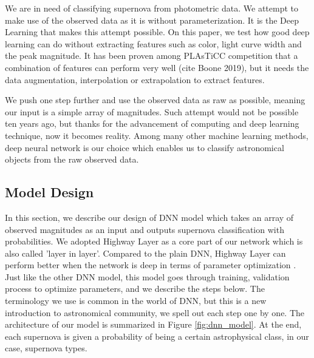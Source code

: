 \documentclass[useamsfonts]{pasj01}
\begin{document}
We are in need of classifying supernova from photometric data.  We attempt to make use of the observed data as it is without parameterization.  It is the Deep Learning that makes this attempt possible.   On this paper, we test how good deep learning can do without extracting features such as color, light curve width and the peak magnitude.  It has been proven among PLAsTiCC competition that a combination of features can perform very well (cite Boone 2019), but it needs the data augmentation, interpolation or extrapolation to extract features.

We push one step further and use the observed data as raw as possible, meaning our input is a simple array of magnitudes.  Such attempt would not be possible ten years ago, but thanks for the advancement of computing and deep learning technique, now it becomes reality.  Among many other machine learning methods, deep neural network is our choice which enables us to classify astronomical objects from the raw observed data. 

\subsection{Model Design}
\label{sec:model} %
In this section, we describe our design of DNN model which takes an array of observed magnitudes as an input and outputs supernova classification with probabilities.  We adopted Highway Layer \citep{srivastava15a} as a core part of our network which is also called 'layer in layer'.  Compared to the plain DNN, Highway Layer can perform better when the network is deep in terms of parameter optimization \citep{srivastava15b}.   
Just like the other DNN model, this model goes through training, validation process to optimize parameters, and we describe the steps below.  The terminology we use is common in the world of DNN, but this is a new introduction to astronomical community, we spell out each step one by one.  The architecture of our model is summarized in Figure \ref{fig:dnn_model}.
At the end, each supernova is given a probability of being a certain astrophysical class, in our case, supernova types. 
\end{document}
